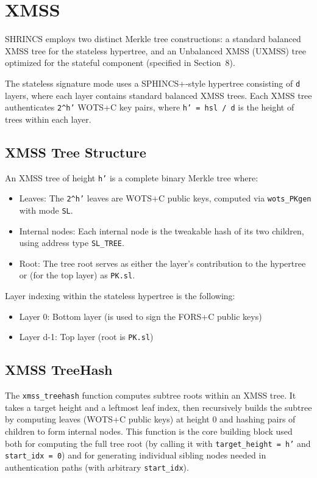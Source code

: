 \section{XMSS}
SHRINCS employs two distinct Merkle tree constructions: a standard balanced XMSS tree for the stateless hypertree, and an Unbalanced XMSS (UXMSS) tree optimized for the stateful component (specified in Section~8).

The stateless signature mode uses a SPHINCS+-style hypertree consisting of \texttt{d} layers, where each layer contains standard balanced XMSS trees. Each XMSS tree authenticates \texttt{2\string^h'} WOTS+C key pairs, where \texttt{h' = hsl / d} is the height of trees within each layer.

\subsection{XMSS Tree Structure}
An XMSS tree of height \texttt{h'} is a complete binary Merkle tree where:
\begin{itemize}
    \item Leaves: The \texttt{2\string^h'} leaves are WOTS+C public keys, computed via \texttt{wots\_PKgen} with mode \texttt{SL}.
    \item Internal nodes: Each internal node is the tweakable hash of its two children, using address type \texttt{SL\_TREE}.
    \item Root: The tree root serves as either the layer's contribution to the hypertree or (for the top layer) as \texttt{PK.sl}.
\end{itemize}

Layer indexing within the stateless hypertree is the following:
\begin{itemize}
    \item Layer 0: Bottom layer (is used to sign the FORS+C public keys)
    \item Layer d-1: Top layer (root is \texttt{PK.sl})
\end{itemize}

\subsection{XMSS TreeHash}
The \texttt{xmss\_treehash} function computes subtree roots within an XMSS tree. It takes a target height and a leftmost leaf index, then recursively builds the subtree by computing leaves (WOTS+C public keys) at height 0 and hashing pairs of children to form internal nodes. This function is the core building block used both for computing the full tree root (by calling it with \texttt{target\_height = h'} and \texttt{start\_idx = 0}) and for generating individual sibling nodes needed in authentication paths (with arbitrary \texttt{start\_idx}).

